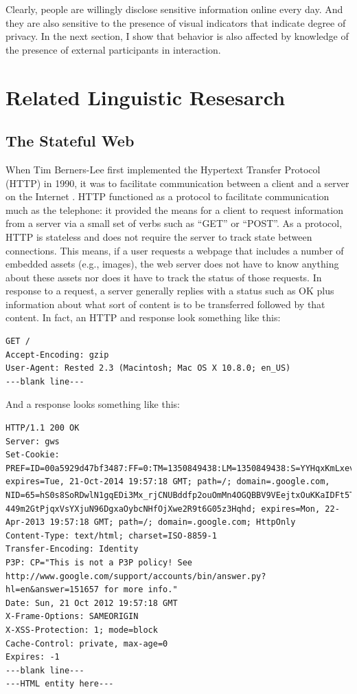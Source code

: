 Clearly, people are willingly disclose sensitive information online every day. And they are also sensitive to the presence of visual indicators that indicate degree of privacy. In the next section, I show that behavior is also affected by knowledge of the presence of external participants in interaction.

\section{Related Linguistic Resesarch}
\label{relatedlinguisticresesarch}

\subsection{The Stateful Web}
\label{thestatefulweb}

When Tim Berners-Lee first implemented the Hypertext Transfer Protocol (HTTP) in 1990, it was to facilitate communication between a client and a server on the Internet  \citep{Thewebsiteofthew:vo}.  HTTP functioned as a protocol to facilitate communication much as the telephone: it provided the means for a client to request information from a server via a small set of verbs such as ``GET'' or ``POST''. As a protocol, HTTP is stateless and does not require the server to track state between connections. This means, if a user requests a webpage that includes a number of embedded assets (e.g., images), the web server does not have to know anything about these assets nor does it have to track the status of those requests. In response to a request, a server generally replies with a status such as OK plus information about what sort of content is to be transferred followed by that content. In fact, an HTTP and response look something like this:

\begin{lstlisting}[numbers=none]
GET /
Accept-Encoding: gzip
User-Agent: Rested 2.3 (Macintosh; Mac OS X 10.8.0; en_US) 
---blank line---
\end{lstlisting}

And a response looks something like this:

\begin{lstlisting}[numbers=none]
HTTP/1.1 200 OK
Server: gws
Set-Cookie: PREF=ID=00a5929d47bf3487:FF=0:TM=1350849438:LM=1350849438:S=YYHqxKmLxevdwbvo; expires=Tue, 21-Oct-2014 19:57:18 GMT; path=/; domain=.google.com, NID=65=hS0s8SoRDwlN1gqEDi3Mx_rjCNUBddfp2ouOmMn4OGQBBV9VEejtxOuKKaIDFt5TMyrBs0ZGBZ3BH-449m2GtPjqxVsYXjuN96DgxaOybcNHfOjXwe2R9t6G05z3Hqhd; expires=Mon, 22-Apr-2013 19:57:18 GMT; path=/; domain=.google.com; HttpOnly
Content-Type: text/html; charset=ISO-8859-1
Transfer-Encoding: Identity
P3P: CP="This is not a P3P policy! See http://www.google.com/support/accounts/bin/answer.py?hl=en&answer=151657 for more info."
Date: Sun, 21 Oct 2012 19:57:18 GMT
X-Frame-Options: SAMEORIGIN
X-XSS-Protection: 1; mode=block
Cache-Control: private, max-age=0
Expires: -1
---blank line---
---HTML entity here---
\end{lstlisting}

